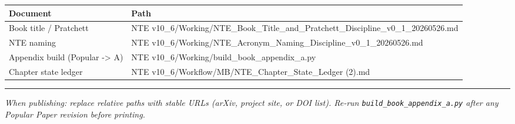 \documentclass[
  11pt,
]{article}
\newcounter{none} %
\begin{document}
{\def\LTcaptype{none} %
\begin{longtable}[]{@{}
  >{\raggedright\arraybackslash}p{}
  >{\raggedright\arraybackslash}p{}@{}}
\toprule\noalign{}
\begin{minipage}[b]{\linewidth}\raggedright
Document
\end{minipage} & \begin{minipage}[b]{\linewidth}\raggedright
Path
\end{minipage} \\
\midrule\noalign{}
\endhead
\bottomrule\noalign{}
\endlastfoot
Book title / Pratchett & NTE
v10\_6/Working/NTE\_Book\_Title\_and\_Pratchett\_Discipline\_v0\_1\_20260526.md \\
NTE naming & NTE
v10\_6/Working/NTE\_Acronym\_Naming\_Discipline\_v0\_1\_20260526.md \\
Appendix build (Popular -\textgreater{} A) & NTE
v10\_6/Working/build\_book\_appendix\_a.py \\
Chapter state ledger & NTE
v10\_6/Workflow/MB/NTE\_Chapter\_State\_Ledger (2).md \\
\end{longtable}
}

\begin{center}\rule{0.5\linewidth}{0.5pt}\end{center}

\emph{When publishing: replace relative paths with stable URLs (arXiv,
project site, or DOI list). Re-run \texttt{build\_book\_appendix\_a.py}
after any Popular Paper revision before printing.}
\end{document}
